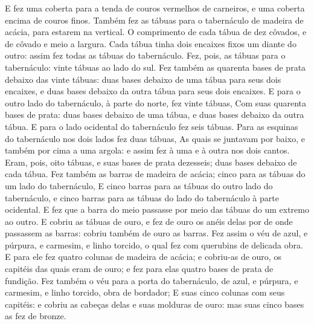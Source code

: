 {E fez uma coberta para a tenda de couros vermelhos de carneiros, e uma coberta encima de couros finos.
Também fez as tábuas para o tabernáculo de madeira de acácia, para estarem na vertical.
O comprimento de cada tábua de dez côvados, e de côvado e meio a largura.
Cada tábua tinha dois encaixes fixos um diante do outro: assim fez todas as tábuas do tabernáculo.
Fez, pois, as tábuas para o tabernáculo: vinte tábuas ao lado do sul.
Fez também as quarenta bases de prata debaixo das vinte tábuas: duas bases debaixo de uma tábua para seus dois encaixes, e duas bases debaixo da outra tábua para seus dois encaixes.
E para o outro lado do tabernáculo, à parte do norte, fez vinte tábuas,
Com suas quarenta bases de prata: duas bases debaixo de uma tábua, e duas bases debaixo da outra tábua.
E para o lado ocidental do tabernáculo fez seis tábuas.
Para as esquinas do tabernáculo nos dois lados fez duas tábuas,
As quais se juntavam por baixo, e também por cima a uma argola: e assim fez à uma e à outra nos dois cantos.
Eram, pois, oito tábuas, e suas bases de prata dezesseis; duas bases debaixo de cada tábua.
Fez também as barras de madeira de acácia; cinco para as tábuas do um lado do tabernáculo,
E cinco barras para as tábuas do outro lado do tabernáculo, e cinco barras para as tábuas do lado do tabernáculo à parte ocidental.
E fez que a barra do meio passasse por meio das tábuas do um extremo ao outro.
E cobriu as tábuas de ouro, e fez de ouro os anéis delas por de onde passassem as barras: cobriu também de ouro as barras.
Fez assim o véu de azul, e púrpura, e carmesim, e linho torcido, o qual fez com querubins de delicada obra.
E para ele fez quatro colunas de madeira de acácia; e cobriu-as de ouro, os capitéis das quais eram de ouro; e fez para elas quatro bases de prata de fundição.
Fez também o véu para a porta do tabernáculo, de azul, e púrpura, e carmesim, e linho torcido, obra de bordador;
E suas cinco colunas com seus capitéis: e cobriu as cabeças delas e suas molduras de ouro: mas suas cinco bases as fez de bronze.

}
